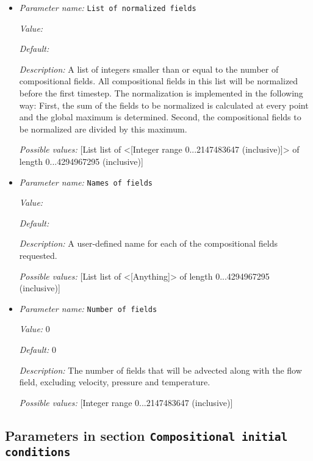 \begin{itemize}
\item {\it Parameter name:} {\tt List of normalized fields}
\label{parameters:Compositional fields/List of normalized fields}


{\it Value:} 


{\it Default:} 


{\it Description:} A list of integers smaller than or equal to the number of compositional fields. All compositional fields in this list will be normalized before the first timestep. The normalization is implemented in the following way: First, the sum of the fields to be normalized is calculated at every point and the global maximum is determined. Second, the compositional fields to be normalized are divided by this maximum.


{\it Possible values:} [List list of <[Integer range 0...2147483647 (inclusive)]> of length 0...4294967295 (inclusive)]
\item {\it Parameter name:} {\tt Names of fields}
\label{parameters:Compositional fields/Names of fields}


{\it Value:} 


{\it Default:} 


{\it Description:} A user-defined name for each of the compositional fields requested.


{\it Possible values:} [List list of <[Anything]> of length 0...4294967295 (inclusive)]
\item {\it Parameter name:} {\tt Number of fields}
\label{parameters:Compositional fields/Number of fields}


{\it Value:} 0


{\it Default:} 0


{\it Description:} The number of fields that will be advected along with the flow field, excluding velocity, pressure and temperature.


{\it Possible values:} [Integer range 0...2147483647 (inclusive)]
\end{itemize}

\subsection{Parameters in section \tt Compositional initial conditions}
\label{parameters:Compositional_20initial_20conditions}


